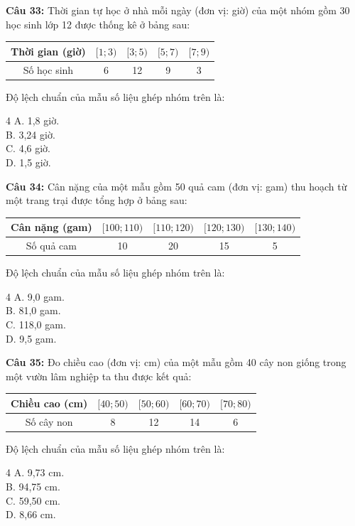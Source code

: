 \documentclass[12pt]{article}
\begin{document}
	\vspace{4mm}
	
	\noindent \textbf{Câu 33:} Thời gian tự học ở nhà mỗi ngày (đơn vị: giờ) của một nhóm gồm 30 học sinh lớp 12 được thống kê ở bảng sau:
	\begin{center}
		\renewcommand{\arraystretch}{1.3}
		\begin{tabular}{|c|c|c|c|c|}
			\hline
			Thời gian (giờ) & $[1; 3)$ & $[3; 5)$ & $[5; 7)$ & $[7; 9)$ \\
			\hline
			Số học sinh & 6 & 12 & 9 & 3 \\
			\hline
		\end{tabular}
	\end{center}
	Độ lệch chuẩn của mẫu số liệu ghép nhóm trên là:
	\begin{multicols}{4}
		A. 1,8 giờ. \\
		B. 3,24 giờ. \\
		C. 4,6 giờ. \\
		D. 1,5 giờ.
	\end{multicols}
	
	\vspace{4mm}
	
	\noindent \textbf{Câu 34:} Cân nặng của một mẫu gồm 50 quả cam (đơn vị: gam) thu hoạch từ một trang trại được tổng hợp ở bảng sau:
	\begin{center}
		\renewcommand{\arraystretch}{1.3}
		\begin{tabular}{|c|c|c|c|c|}
			\hline
			Cân nặng (gam) & $[100; 110)$ & $[110; 120)$ & $[120; 130)$ & $[130; 140)$ \\
			\hline
			Số quả cam & 10 & 20 & 15 & 5 \\
			\hline
		\end{tabular}
	\end{center}
	Độ lệch chuẩn của mẫu số liệu ghép nhóm trên là:
	\begin{multicols}{4}
		A. 9,0 gam. \\
		B. 81,0 gam. \\
		C. 118,0 gam. \\
		D. 9,5 gam.
	\end{multicols}
	
	\vspace{4mm}
	
	\noindent \textbf{Câu 35:} Đo chiều cao (đơn vị: cm) của một mẫu gồm 40 cây non giống trong một vườn lâm nghiệp ta thu được kết quả:
	\begin{center}
		\renewcommand{\arraystretch}{1.3}
		\begin{tabular}{|c|c|c|c|c|}
			\hline
			Chiều cao (cm) & $[40; 50)$ & $[50; 60)$ & $[60; 70)$ & $[70; 80)$ \\
			\hline
			Số cây non & 8 & 12 & 14 & 6 \\
			\hline
		\end{tabular}
	\end{center}
	Độ lệch chuẩn của mẫu số liệu ghép nhóm trên là:
	\begin{multicols}{4}
		A. 9,73 cm. \\
		B. 94,75 cm. \\
		C. 59,50 cm. \\
		D. 8,66 cm.
	\end{multicols}
	
\end{document}
